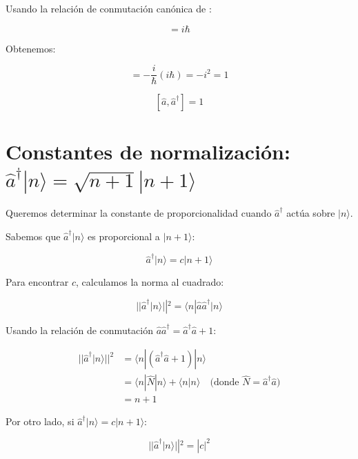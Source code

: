 \documentclass[11pt,a4paper,spanish]{book}
\begin{document}
Usando la relación de conmutación canónica de \cite{born1925}:

\begin{equation}
	[\hat{x}, \hat{p}] = i\hbar
\end{equation}

Obtenemos:

\begin{equation}
	[\hat{a}, \hat{a}^\dagger] = -\frac{i}{\hbar}(i\hbar) = -i^2 = 1
\end{equation}

\begin{equation}
	\boxed{[\hat{a}, \hat{a}^\dagger] = 1}
\end{equation}	
	
	


\section{Constantes de normalización: $\hat{a}^\dagger|n\rangle = \sqrt{n+1}|n+1\rangle$} \label{sec:normalizacion1}

Queremos determinar la constante de proporcionalidad cuando $\hat{a}^\dagger$ actúa sobre $|n\rangle$.

Sabemos que $\hat{a}^\dagger|n\rangle$ es proporcional a $|n+1\rangle$:

\begin{equation}
	\hat{a}^\dagger|n\rangle = c|n+1\rangle
\end{equation}

Para encontrar $c$, calculamos la norma al cuadrado:

\begin{equation}
	||\hat{a}^\dagger|n\rangle||^2 = \langle n|\hat{a}\hat{a}^\dagger|n\rangle
\end{equation}

Usando la relación de conmutación $\hat{a}\hat{a}^\dagger = \hat{a}^\dagger\hat{a} + 1$:

\begin{align}
	||\hat{a}^\dagger|n\rangle||^2 &= \langle n|(\hat{a}^\dagger\hat{a} + 1)|n\rangle \tag{A.14}\\
	&= \langle n|\hat{N}|n\rangle + \langle n|n\rangle \quad \text{(donde } \hat{N} = \hat{a}^\dagger\hat{a}\text{)} \tag{A.15}\\
	&= n + 1 \tag{A.16}
\end{align}

Por otro lado, si $\hat{a}^\dagger|n\rangle = c|n+1\rangle$:

\begin{equation}
	||\hat{a}^\dagger|n\rangle||^2 = |c|^2
\end{equation}
\end{document}
